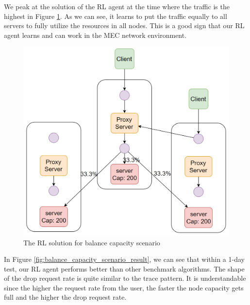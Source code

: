 \documentclass[conference]{IEEEtran}
\begin{document}
We peak at the solution of the RL agent at the time where the traffic is the highest in Figure \ref{fig:balance_capacity_RL_solution}. As we can see, it learns to put the traffic equally to all servers to fully utilize the resources in all nodes. This is a good sign that our RL agent learns and can work in the MEC network environment. 

\begin{figure}[]
    \centering
    \includegraphics[scale = 0.5]{imgs/balance_capacity_RL_solution.png}
    \caption{The RL solution for balance capacity scenario}
    \label{fig:balance_capacity_RL_solution}
\end{figure}

In Figure \ref{fig:balance_capacity_scenario_result}, we can see that within a 1-day test, our RL agent performs better than other benchmark algorithms. The shape of the drop request rate is quite similar to the trace pattern. It is understandable since the higher the request rate from the user, the faster the node capacity gets full and the higher the drop request rate.
\end{document}
